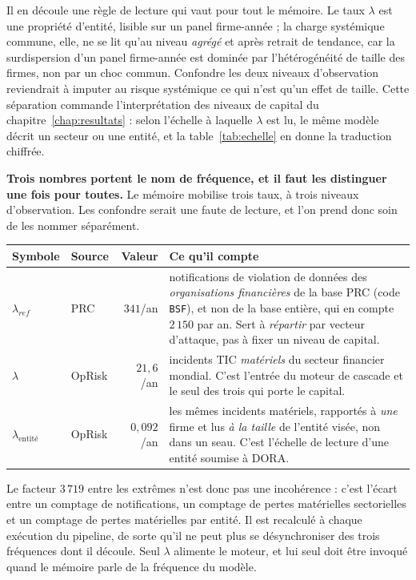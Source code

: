 Il en découle une règle de lecture qui vaut pour tout le mémoire. Le taux
$\lambda$ est une propriété d'entité, lisible sur un panel
firme-année ; la charge systémique commune, elle, ne se lit qu'au niveau
\emph{agrégé} et après retrait de tendance, car la surdispersion d'un panel
firme-année est dominée par l'hétérogénéité de taille des firmes, non par un
choc commun. Confondre les deux niveaux d'observation reviendrait à imputer au
risque systémique ce qui n'est qu'un effet de taille. Cette séparation
commande l'interprétation des niveaux de capital du
chapitre~\ref{chap:resultats} : selon l'échelle à laquelle $\lambda$ est lu,
le même modèle décrit un secteur ou une entité, et la
table~\ref{tab:echelle} en donne la traduction chiffrée.

\begin{attention}
\textbf{Trois nombres portent le nom de \og{}fréquence\fg{}, et il faut les distinguer une
fois pour toutes.} Le mémoire mobilise trois taux, à trois niveaux d'observation. Les
confondre serait une faute de lecture, et l'on prend donc soin de les nommer séparément.
\begin{center}\small
\renewcommand{\arraystretch}{1.3}
\begin{tabular}{@{}l l r p{5.1cm}@{}}
\toprule
\textbf{Symbole} & \textbf{Source} & \textbf{Valeur} & \textbf{Ce qu'il compte} \\
\midrule
$\lambda_{ref}$ & PRC & $341$/an & notifications de violation de données des
\emph{organisations financières} de la base PRC (code \texttt{BSF}), et non de la base
entière, qui en compte $2\,150$ par an. Sert à \emph{répartir} par vecteur d'attaque, pas à
fixer un niveau de capital. \\
$\lambda$ & OpRisk & $21{,}6$/an & incidents TIC \emph{matériels} du secteur
financier mondial. C'est l'entrée du moteur de cascade et le seul des trois qui
porte le capital. \\
$\lambda_{\text{entité}}$ & OpRisk & $0{,}092$/an & les mêmes incidents matériels, rapportés
à \emph{une} firme et lus \emph{à la taille} de l'entité visée, non dans un seau. C'est
l'échelle de lecture d'une entité soumise à DORA. \\
\bottomrule
\end{tabular}
\end{center}
\vspace{2pt}
Le facteur $3\,719$ entre les extrêmes n'est donc pas une incohérence : c'est l'écart entre
un comptage de notifications, un comptage de pertes matérielles sectorielles et un comptage
de pertes matérielles par entité. Il est recalculé à chaque exécution du pipeline, de sorte
qu'il ne peut plus se désynchroniser des trois fréquences dont il découle.
Seul $\lambda$ alimente le
moteur, et lui
seul doit être invoqué quand le mémoire parle de \og{}la fréquence du modèle\fg{}.
\end{attention}


